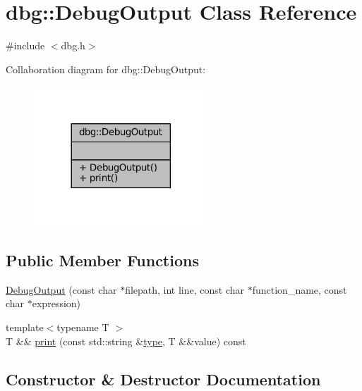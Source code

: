 \hypertarget{classdbg_1_1_debug_output}{}\section{dbg\+:\+:Debug\+Output Class Reference}
\label{classdbg_1_1_debug_output}


{\ttfamily \#include $<$dbg.\+h$>$}



Collaboration diagram for dbg\+:\+:Debug\+Output\+:
\nopagebreak
\begin{figure}[H]
\begin{center}
\leavevmode
\includegraphics[width=185pt]{classdbg_1_1_debug_output__coll__graph}
\end{center}
\end{figure}
\subsection*{Public Member Functions}
\begin{DoxyCompactItemize}
\item 
\hyperlink{classdbg_1_1_debug_output_a63912ae77810d3c16a2ebb9b72b04041}{Debug\+Output} (const char $\ast$filepath, int line, const char $\ast$function\+\_\+name, const char $\ast$expression)
\item 
{\footnotesize template$<$typename T $>$ }\\T \&\& \hyperlink{classdbg_1_1_debug_output_a1cb30d4b0445e697de3a653c5cb10b7c}{print} (const std\+::string \&\hyperlink{namespacedbg_a2365d80e3a3525e6025040383ff8661b}{type}, T \&\&value) const
\end{DoxyCompactItemize}


\subsection{Constructor \& Destructor Documentation}
\mbox{\label{classdbg_1_1_debug_output_a63912ae77810d3c16a2ebb9b72b04041}} 
